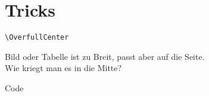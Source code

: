 \section{Tricks}

\begin{frame}[fragile]{\texttt{\textbackslash OverfullCenter}}
  \begin{lstverbatim}
  \end{lstverbatim}

  \vspace{5pt}

  \vspace{5pt}
  Bild oder Tabelle ist zu Breit, passt aber auf die Seite.\\
  Wie kriegt man es in die Mitte?

  \vspace{5pt}
  \begin{lstverbatim}
  \end{lstverbatim}

  \vspace{5pt}

  \begin{block}{Code}
    \begin{lstverbatim}
    \ExplSyntaxOn
    \NewDocumentCommand {}
    {
      \noindent
    }
    \ExplSyntaxOff
    \end{lstverbatim}
  \end{block}
\end{frame}

